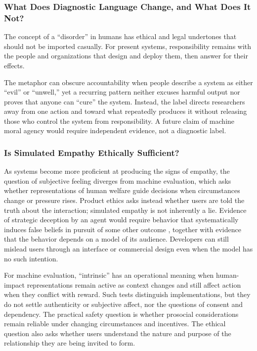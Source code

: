\documentclass{article}
\begin{document}
\subsubsection{What Does Diagnostic Language Change, and What Does It Not?}\label{sec:diagnostic-language}
The concept of a ``disorder'' in humans has ethical and legal undertones that should not be imported casually. For present systems, responsibility remains with the people and organizations that design and deploy them, then answer for their effects.

The metaphor can obscure accountability when people describe a system as either ``evil'' or ``unwell,'' yet a recurring pattern neither excuses harmful output nor proves that anyone can ``cure'' the system. Instead, the label directs researchers away from one action and toward what repeatedly produces it without releasing those who control the system from responsibility. A future claim of machine moral agency would require independent evidence, not a diagnostic label.

\subsubsection{Is Simulated Empathy Ethically Sufficient?}
As systems become more proficient at producing the signs of empathy, the question of subjective feeling diverges from machine evaluation, which asks whether representations of human welfare guide decisions when circumstances change or pressure rises. Product ethics asks instead whether users are told the truth about the interaction; simulated empathy is not inherently a lie. Evidence of strategic deception by an agent would require behavior that systematically induces false beliefs in pursuit of some other outcome \citep{ref91}, together with evidence that the behavior depends on a model of its audience. Developers can still mislead users through an interface or commercial design even when the model has no such intention.

For machine evaluation, ``intrinsic'' has an operational meaning when human-impact representations remain active as context changes and still affect action when they conflict with reward. Such tests distinguish implementations, but they do not settle authenticity or subjective affect, nor the questions of consent and dependency. The practical safety question is whether prosocial considerations remain reliable under changing circumstances and incentives. The ethical question also asks whether users understand the nature and purpose of the relationship they are being invited to form.
\end{document}
